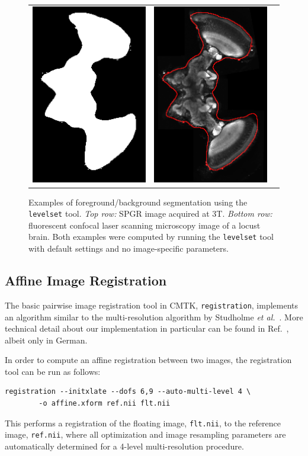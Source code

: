 \documentclass{InsightArticle}
\begin{document}
\begin{figure}[tb]
\begin{center}
\begin{tabular}{ccc}
\includegraphics[width=.3\linewidth]{img/levelset_locust_mask}&
\includegraphics[width=.3\linewidth]{img/levelset_locust_ovl}
\end{tabular}
\end{center}
\caption{Examples of foreground/background segmentation using the {\tt
levelset} tool. {\em Top row:\/} SPGR image acquired at 3T. {\em Bottom
row:\/} fluorescent confocal laser scanning microscopy image of a locust
brain. Both examples were computed by running the {\tt levelset} tool with
default settings and no image-specific parameters.}
\label{fig:Levelset}
\end{figure}

\subsection{Affine Image Registration}

The basic pairwise image registration tool in CMTK, \verb|registration|,
implements an algorithm similar to the multi-resolution algorithm by Studholme
{\em et al.\/}~\cite{StudHillHawk:1997}. More technical detail about our
implementation in particular can be found in Ref.~\cite{Rohlfing:2000}, albeit
only in German.

In order to compute an affine registration between two images, the
registration tool can be run as follows:
\begin{verbatim}
registration --initxlate --dofs 6,9 --auto-multi-level 4 \
        -o affine.xform ref.nii flt.nii
\end{verbatim}
This performs a registration of the floating image, \verb|flt.nii|, to the
reference image, \verb|ref.nii|, where all optimization and image resampling
parameters are automatically determined for a 4-level multi-resolution
procedure. 
\end{document}
